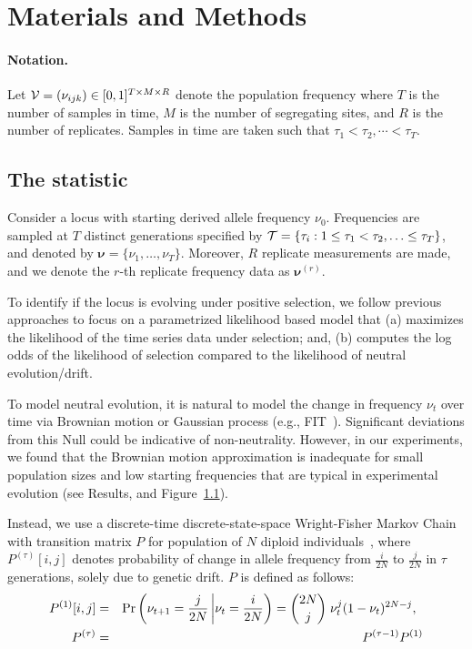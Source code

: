 \documentclass[11pt]{article}
\def\comale{\text{COMALE }}
\begin{document}
\section{Materials and Methods}

\paragraph{Notation.} Let ${\cal V}  = (\nu_{ijk}) \in [0, 1]^{T \times 
M\times R}$ denote the population frequency where $T$ is the number of samples 
in time, $M$ is the number of segregating sites, and $R$ is the number of 
replicates. Samples in time are taken such that $\tau_1<\tau_2,\cdots<\tau_T$.

\subsection{The \comale statistic}
Consider a locus with starting derived allele frequency
$\nu_0$. Frequencies are sampled at $T$ distinct generations specified
by ${\cal T}= \{\tau_i: 1\le \tau_1<\tau_2,\ldots\le \tau_T\}$, and
denoted by $\bm{\nu}=\{\nu_1,\ldots,\nu_T\}$. Moreover, $R$ replicate
measurements are made, and we denote the $r$-th replicate frequency
data as $\bm{\nu}^{(r)}$.

To identify if the locus is evolving under positive selection, we
follow previous approaches to focus on a parametrized likelihood based
model that (a) maximizes the likelihood of the time series data under
selection; and, (b) computes the log odds of the likelihood of
selection compared to the likelihood of neutral evolution/drift.

To model neutral evolution, it is natural to model the change in
frequency $\nu_t$ over time via Brownian motion or Gaussian process
(e.g., FIT~\cite{}). Significant deviations from this Null could be
indicative of non-neutrality. However, in our experiments, we found
that the Brownian motion approximation is inadequate for small
population sizes and low starting frequencies that are typical in
experimental evolution (see Results, and Figure~\ref{}).

Instead, we use a discrete-time discrete-state-space Wright-Fisher
Markov Chain with transition matrix $P$ for population of $N$ diploid
individuals~\cite{Ewens2012Mathematical}, where $P^{(\tau)}[i,j]$
denotes probability of change in allele frequency from $\frac{i}{2N}$
to $\frac{j}{2N}$ in $\tau$ generations, solely due to genetic
drift. $P$ is defined as follows:
\begin{eqnarray}
  P^{(1)}[i,j] &=& \operatorname{Pr}\left(\nu_{t+1}=\frac{j}{2N} \left|
      \nu_{t}=\frac{i}{2N}\right)={2N \choose j} \right.  \nu_{t}^j
  (1-\nu_{t})^{2N-j}, \;\;\\
  P^{(\tau)} &=&   P^{(\tau-1)}P^{(1)}\\
\end{eqnarray}
\end{document}
